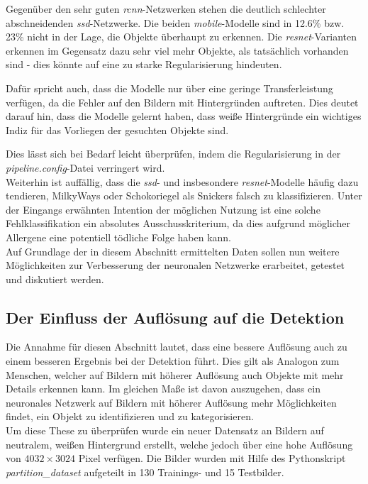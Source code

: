 \documentclass[12pt, oneside]{article}
\begin{document}
Gegenüber den sehr guten \textit{rcnn}-Netzwerken stehen die deutlich schlechter abschneidenden \textit{ssd}-Netzwerke. Die beiden \textit{mobile}-Modelle sind in 12.6\% bzw. 23\% nicht in der Lage, die Objekte überhaupt zu erkennen. Die \textit{resnet}-Varianten erkennen im Gegensatz dazu sehr viel mehr Objekte, als tatsächlich vorhanden sind - dies könnte auf eine zu starke Regularisierung hindeuten.

Dafür spricht auch, dass die Modelle nur über eine geringe Transferleistung verfügen, da die Fehler auf den Bildern mit Hintergründen auftreten. Dies deutet darauf hin, dass die Modelle gelernt haben, dass weiße Hintergründe ein wichtiges Indiz für das Vorliegen der gesuchten Objekte sind.

Dies lässt sich bei Bedarf leicht überprüfen, indem die Regularisierung in der \textit{pipeline.config}-Datei verringert wird.\\ 

Weiterhin ist auffällig, dass die \textit{ssd}- und insbesondere \textit{resnet}-Modelle häufig dazu tendieren, MilkyWays oder Schokoriegel als Snickers falsch zu klassifizieren. Unter der Eingangs erwähnten Intention der möglichen Nutzung ist eine solche Fehlklassifikation ein absolutes Ausschusskriterium, da dies aufgrund möglicher Allergene eine potentiell tödliche Folge haben kann.\\

Auf Grundlage der in diesem Abschnitt ermittelten Daten sollen nun weitere Möglichkeiten zur Verbesserung der neuronalen Netzwerke erarbeitet, getestet und diskutiert werden.




\subsection{Der Einfluss der Auflösung auf die Detektion}

Die Annahme für diesen Abschnitt lautet, dass eine bessere Auflösung auch zu einem besseren Ergebnis bei der Detektion führt. Dies gilt als Analogon zum Menschen, welcher auf Bildern mit höherer Auflösung auch Objekte mit mehr Details erkennen kann. Im gleichen Maße ist davon auszugehen, dass ein neuronales Netzwerk auf Bildern mit höherer Auflösung mehr Möglichkeiten findet, ein Objekt zu identifizieren und zu kategorisieren.\\

Um diese These zu überprüfen wurde ein neuer Datensatz an Bildern auf neutralem, weißen Hintergrund erstellt, welche jedoch über eine hohe Auflösung von $4032\times3024$ Pixel verfügen. Die Bilder wurden mit Hilfe des Pythonskript \textit{partition\_dataset} aufgeteilt in 130 Trainings- und 15 Testbilder.\\
\end{document}

